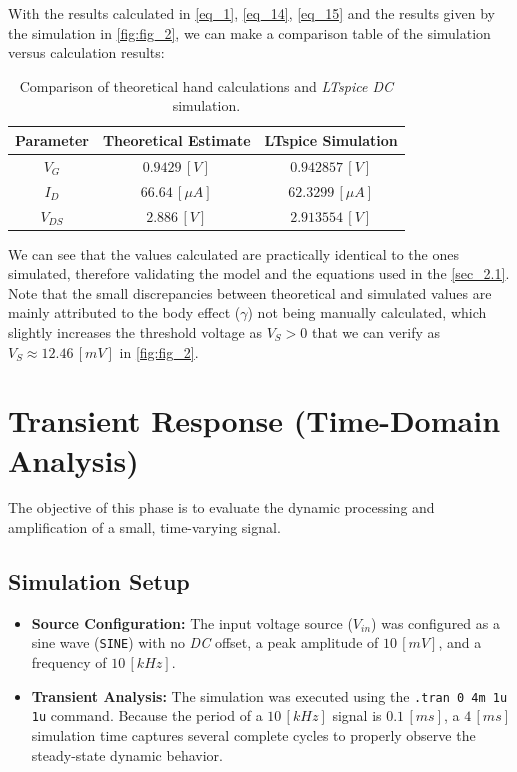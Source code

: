 \documentclass[12pt,a4paper]{article}
\begin{document}
With the results calculated in \autoref{eq_1}, \autoref{eq_14}, \autoref{eq_15} and the results given by the simulation in \autoref{fig:fig_2}, we can make a comparison table of the simulation versus calculation results:
\begin{table}[H]
    \centering
    \begin{tabular}{|c|c|c|} \hline
    \textbf{Parameter} & \textbf{Theoretical Estimate} & \textbf{LTspice Simulation} \\ \hline
    $V_{G}$     & $0.9429 \, [V]$       & $0.942857 \, [V]$     \\ \hline
    $I_{D}$     & $66.64 \, [\mu A]$    & $62.3299 \, [\mu A]$  \\ \hline
    $V_{DS}$    & $2.886 \, [V]$        & $2.913554 \, [V]$     \\ \hline
    \end{tabular}
    \caption{Comparison of theoretical hand calculations and \textit{LTspice DC} simulation.}
    \label{tab:tab_1}
\end{table}

We can see that the values calculated are practically identical to the ones simulated, therefore validating the model and the equations used in the \autoref{sec_2.1}. Note that the small discrepancies between theoretical and simulated values are mainly attributed to the body effect ($\gamma$) not being manually calculated, which slightly increases the threshold voltage as $V_{S} > 0$ that we can verify as $V_{S} \approx 12.46 \, [mV]$ in \autoref{fig:fig_2}.



\section{Transient Response (Time-Domain Analysis)}             \label{sec_3}    
The objective of this phase is to evaluate the dynamic processing and amplification of a small, time-varying signal.


\subsection{Simulation Setup}                                   \label{sec_3.1}
\begin{itemize}
    \item \textbf{Source Configuration:} The input voltage source ($V_{in}$) was configured as a sine wave (\texttt{SINE}) with no \textit{DC} offset, a peak amplitude of $10 \, [mV]$, and a frequency of $10 \, [kHz]$.
    \item \textbf{Transient Analysis:} The simulation was executed using the \texttt{.tran 0 4m 1u 1u} command. Because the period of a $10 \, [kHz]$ signal is $0.1 \, [ms]$, a $4 \, [ms]$ simulation time captures several complete cycles to properly observe the steady-state dynamic behavior.
\end{itemize}
\end{document}
